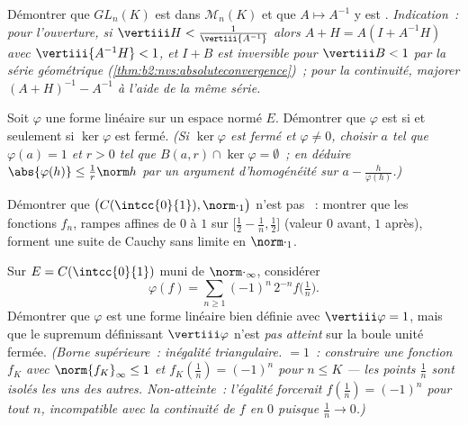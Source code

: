 \begin{exercise}[$\star\star$]\label{exo:b2:nvs:5}
Démontrer que $GL_n(K)$ est  dans $\mathcal{M}_n(K)$ et que $A
\mapsto A^{-1}$ y est . \emph{Indication~: pour l'ouverture, si
$\vertiii H < \frac{1}{\vertiii{A^{-1}}}$ alors $A + H = A(I +
A^{-1}H)$ avec $\vertiii{A^{-1}H} < 1$, et $I + B$ est inversible
pour $\vertiii B < 1$ par la série géométrique
(\cref{thm:b2:nvs:absoluteconvergence})~; pour la continuité, majorer
$(A+H)^{-1} - A^{-1}$ à l'aide de la même série.}
\end{exercise}

\begin{exercise}[$\star\star$]\label{exo:b2:nvs:6}
Soit $\varphi$ une forme linéaire sur un espace normé $E$. Démontrer que
$\varphi$ est  si et seulement si $\ker\varphi$ est fermé.
\emph{(Si $\ker\varphi$ est fermé et $\varphi \neq 0$, choisir $a$
tel que $\varphi(a) = 1$ et $r > 0$ tel que $B(a, r) \cap \ker\varphi =
\emptyset$~; en déduire $\abs{\varphi(h)} \leq \frac{1}{r}\norm h$ par un
argument d'homogénéité sur $a - \frac{h}{\varphi(h)}$.)}
\end{exercise}

\begin{exercise}[$\star\star$]\label{exo:b2:nvs:7}
Démontrer que $\bigl(C(\intcc{0}{1}), \norm\cdot_1\bigr)$ n'est pas
~: montrer que les fonctions $f_n$, rampes affines de $0$ à
$1$ sur $\bigl[\frac12 - \frac1n, \frac12\bigr]$ (valeur $0$
avant, $1$ après), forment une suite de Cauchy sans limite  en
$\norm\cdot_1$.
\end{exercise}

\begin{exercise}[$\star\star\star$]\label{exo:b2:nvs:8}
Sur $E = C(\intcc{0}{1})$ muni de $\norm\cdot_\infty$, considérer
\[
\varphi(f) = \sum_{n \geq 1} (-1)^n\, 2^{-n} f\bigl(\tfrac1n\bigr).
\]
Démontrer que $\varphi$ est une forme linéaire  bien définie avec
$\vertiii\varphi = 1$, mais que le supremum définissant
$\vertiii\varphi$ n'est \emph{pas atteint} sur la boule unité fermée.
\emph{(Borne supérieure~: inégalité triangulaire.  $= 1$~: construire
une fonction  $f_K$ avec $\norm{f_K}_\infty \leq 1$ et $f_K(\frac1n)
= (-1)^n$ pour $n \leq K$ --- les points $\frac1n$ sont isolés les uns
des autres. Non-atteinte~: l'égalité forcerait $f(\frac1n) =
(-1)^n$ pour tout $n$, incompatible avec la continuité de $f$ en $0$
puisque $\frac1n \to 0$.)}
\end{exercise}

